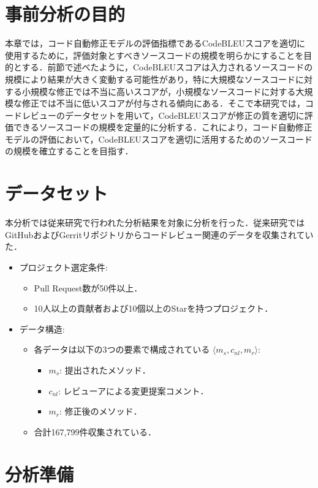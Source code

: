 \documentclass[11pt]{jreport}
\begin{document}
\section {事前分析の目的}
本章では，コード自動修正モデルの評価指標であるCodeBLEUスコアを適切に使用するために，評価対象とすべきソースコードの規模を明らかにすることを目的とする．前節で述べたように，CodeBLEUスコアは入力されるソースコードの規模により結果が大きく変動する可能性があり，特に大規模なソースコードに対する小規模な修正では不当に高いスコアが，小規模なソースコードに対する大規模な修正では不当に低いスコアが付与される傾向にある．そこで本研究では，コードレビューのデータセットを用いて，CodeBLEUスコアが修正の質を適切に評価できるソースコードの規模を定量的に分析する．これにより，コード自動修正モデルの評価において，CodeBLEUスコアを適切に活用するためのソースコードの規模を確立することを目指す．


\section {データセット}
本分析では従来研究で行われた分析結果を対象に分析を行った．従来研究ではGitHubおよびGerritリポジトリからコードレビュー関連のデータを収集されていた．

\begin{itemize}
    \item プロジェクト選定条件:
    \begin{itemize}
        \item Pull Request数が50件以上．
        \item 10人以上の貢献者および10個以上のStarを持つプロジェクト．
    \end{itemize}
    \item データ構造:
    \begin{itemize}
        \item 各データは以下の3つの要素で構成されている $\langle m_s, c_{nl}, m_r \rangle$:
        \begin{itemize}
            \item $m_s$: 提出されたメソッド．
            \item $c_{nl}$: レビューアによる変更提案コメント．
            \item $m_r$: 修正後のメソッド．
        \end{itemize}
        \item 合計167,799件収集されている．
    \end{itemize}
\end{itemize}

\section {分析準備}
\end{document}
